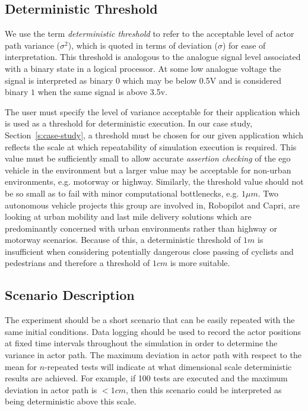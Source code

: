 \documentclass[letterpaper, 10 pt, journal, twoside]{IEEEtran}
\begin{document}
\subsection{Deterministic Threshold}
We use the term \textit{deterministic threshold} to refer to the acceptable level of actor path variance ($\sigma^2$), which is quoted in terms of deviation ($\sigma$) for ease of interpretation. This threshold is analogous to the analogue signal level associated with a binary state in a logical processor. At some low analogue voltage the signal is interpreted as binary $0$ which may be below 0.5V and is considered binary $1$ when the same signal is above 3.5v.

The user must specify the level of variance acceptable for their application which is used as a threshold for deterministic execution. In our case study, Section~\ref{s:case-study}, a threshold must be chosen for our given application which reflects the scale at which repeatability of simulation execution is required. This value must be sufficiently small to allow accurate \textit{assertion checking} of the ego vehicle in the environment but a larger value may be acceptable for non-urban environments, e.g. motorway or highway. Similarly, the threshold value should not be so small as to fail with minor computational bottlenecks, e.g. $1\mu m$. Two autonomous vehicle projects this group are involved in, Robopilot and Capri, are looking at urban mobility and last mile delivery solutions which are predominantly concerned with urban environments rather than highway or motorway scenarios. Because of this, a deterministic threshold of $1m$ is insufficient when considering potentially dangerous close passing of cyclists and pedestrians and therefore a threshold of $1cm$ is more suitable.  


\subsection{Scenario Description}
The experiment should be a short scenario that can be easily repeated with the same initial conditions. Data logging should be used to record the actor positions at fixed time intervals throughout the simulation in order to determine the variance in actor path. The maximum deviation in actor path with respect to the mean for $n$-repeated tests will indicate at what dimensional scale deterministic results are achieved. For example, if 100 tests are executed and the maximum deviation in actor path is $<1cm$, then this scenario could be interpreted as being deterministic above this scale. 
\end{document}
